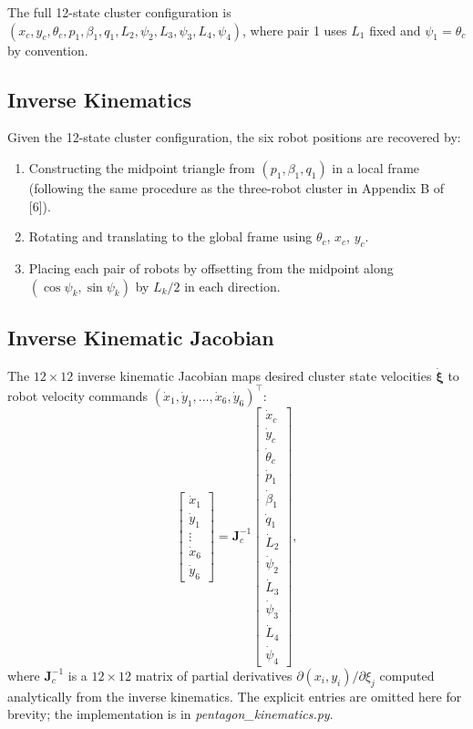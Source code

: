 \documentclass[lettersize,journal]{IEEEtran}
\begin{document}
The full 12-state cluster configuration is
$(x_c, y_c, \theta_c, p_1, \beta_1, q_1, L_2, \psi_2, L_3, \psi_3,
L_4, \psi_4)$, where pair 1 uses $L_1$ fixed and $\psi_1 = \theta_c$ by
convention.

\subsection{Inverse Kinematics}

Given the 12-state cluster configuration, the six robot positions are recovered
by:
\begin{enumerate}
    \item Constructing the midpoint triangle from $(p_1, \beta_1, q_1)$ in
          a local frame (following the same procedure as the three-robot
          cluster in Appendix B of [6]).
    \item Rotating and translating to the global frame using $\theta_c$,
          $x_c$, $y_c$.
    \item Placing each pair of robots by offsetting from the midpoint along
          $(\cos\psi_k, \sin\psi_k)$ by $L_k/2$ in each direction.
\end{enumerate}

\subsection{Inverse Kinematic Jacobian}

The $12 \times 12$ inverse kinematic Jacobian maps desired cluster state
velocities $\dot{\boldsymbol{\xi}}$ to robot velocity commands
$(\dot{x}_1, \dot{y}_1, \ldots, \dot{x}_6, \dot{y}_6)^\top$:
\begin{equation}
    \begin{bmatrix} \dot{x}_1 \\ \dot{y}_1 \\ \vdots \\
    \dot{x}_6 \\ \dot{y}_6 \end{bmatrix}
    =
    \mathbf{J}_c^{-1}
    \begin{bmatrix} \dot{x}_c \\ \dot{y}_c \\ \dot{\theta}_c \\
    \dot{p}_1 \\ \dot{\beta}_1 \\ \dot{q}_1 \\
    \dot{L}_2 \\ \dot{\psi}_2 \\ \dot{L}_3 \\ \dot{\psi}_3 \\
    \dot{L}_4 \\ \dot{\psi}_4 \end{bmatrix},
    \label{eq:inv_kin_jac}
\end{equation}
where $\mathbf{J}_c^{-1}$ is a $12 \times 12$ matrix of partial derivatives
$\partial (x_i, y_i) / \partial \xi_j$ computed analytically from the inverse
kinematics. The explicit entries are omitted here for brevity; the
implementation is in \textit{pentagon\_kinematics.py}.
\end{document}

